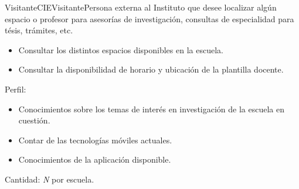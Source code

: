\begin{actor}{Visitante}{CIEVisitante}{Persona externa al Instituto que desee localizar algún espacio o profesor para asesorías de investigación, consultas de especialidad para tésis, trámites, etc.}
\begin{itemize}
		  \item Consultar los distintos espacios disponibles en la escuela.
		  \item Consultar la disponibilidad de horario y ubicación de la plantilla docente.
	  
    \end{itemize}

    \item[Perfil:] \hspace{1pt}

	\begin{itemize}

	    \item Conocimientos sobre los temas de interés en investigación de la escuela en cuestión.
	    \item Contar de las tecnologías móviles actuales.
	    \item Conocimientos de la aplicación disponible.

	\end{itemize}

    \item[Cantidad:] \textit{N} por escuela.

\end{actor}

